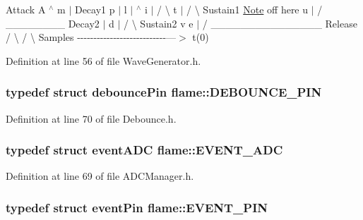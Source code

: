 Attack A $^\wedge$ m $\vert$ Decay1 p $\vert$ l $\vert$ $^\wedge$ i $\vert$ / \textbackslash{} t $\vert$ / \textbackslash{} Sustain1 \hyperlink{structflame_1_1_note}{Note} off here u $\vert$ / \-\_\-\-\_\-\-\_\-\-\_\-\-\_\-\-\_\-\-\_\-\-\_\- Decay2 $\vert$ d $\vert$ / \textbackslash{} Sustain2 v e $\vert$ / \-\_\-\-\_\-\-\_\-\-\_\-\-\_\-\-\_\-\-\_\-\-\_\-\-\_\-\-\_\-\-\_\-\-\_\-\-\_\-\-\_\-\-\_\- Release / \textbackslash{} / \textbackslash{} Samples -\/-\/-\/-\/-\/-\/-\/-\/-\/-\/-\/-\/-\/-\/-\/-\/-\/-\/-\/-\/-\/-\/-\/-\/-\/-\/-\/---$>$ t(0) 

Definition at line 56 of file Wave\-Generator.\-h.

\hypertarget{namespaceflame_a1909d0b4150ee5ef201afa40b431b811}{
\subsubsection[{D\-E\-B\-O\-U\-N\-C\-E\-\_\-\-P\-I\-N}]{\setlength{\rightskip}{0pt plus 5cm}typedef struct {\bf debounce\-Pin} {\bf flame\-::\-D\-E\-B\-O\-U\-N\-C\-E\-\_\-\-P\-I\-N}}}\label{namespaceflame_a1909d0b4150ee5ef201afa40b431b811}


Definition at line 70 of file Debounce.\-h.

\hypertarget{namespaceflame_a0fb9cd960c9db48d9e068daa2427aecf}{
\subsubsection[{E\-V\-E\-N\-T\-\_\-\-A\-D\-C}]{\setlength{\rightskip}{0pt plus 5cm}typedef struct {\bf event\-A\-D\-C} {\bf flame\-::\-E\-V\-E\-N\-T\-\_\-\-A\-D\-C}}}\label{namespaceflame_a0fb9cd960c9db48d9e068daa2427aecf}


Definition at line 69 of file A\-D\-C\-Manager.\-h.

\hypertarget{namespaceflame_a2f4f205987821e931681b9ed5ca0eaf2}{
\subsubsection[{E\-V\-E\-N\-T\-\_\-\-P\-I\-N}]{\setlength{\rightskip}{0pt plus 5cm}typedef struct {\bf event\-Pin} {\bf flame\-::\-E\-V\-E\-N\-T\-\_\-\-P\-I\-N}}}\label{namespaceflame_a2f4f205987821e931681b9ed5ca0eaf2}


